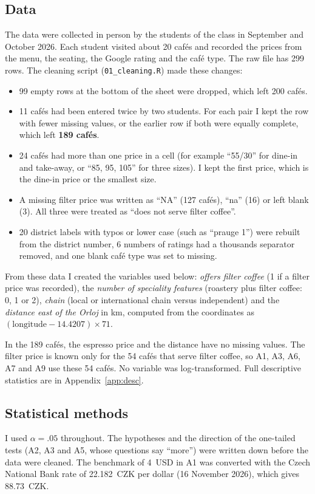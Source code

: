 \documentclass[11pt,a4paper]{article}
\begin{document}
\subsection{Data}
The data were collected in person by the students of the class in September and October 2026. Each student visited about 20 caf\'es and recorded the prices from the menu, the seating, the Google rating and the caf\'e type. The raw file has 299 rows. The cleaning script (\texttt{01\_cleaning.R}) made these changes:
\begin{itemize}
  \item 99 empty rows at the bottom of the sheet were dropped, which left 200 caf\'es.
  \item 11 caf\'es had been entered twice by two students. For each pair I kept the row with fewer missing values, or the earlier row if both were equally complete, which left \textbf{189 caf\'es}.
  \item 24 caf\'es had more than one price in a cell (for example ``55/30'' for dine-in and take-away, or ``85, 95, 105'' for three sizes). I kept the first price, which is the dine-in price or the smallest size.
  \item A missing filter price was written as ``NA'' (127 caf\'es), ``na'' (16) or left blank (3). All three were treated as ``does not serve filter coffee''.
  \item 20 district labels with typos or lower case (such as ``prauge 1'') were rebuilt from the district number, 6 numbers of ratings had a thousands separator removed, and one blank caf\'e type was set to missing.
\end{itemize}
From these data I created the variables used below: \emph{offers filter coffee} (1 if a filter price was recorded), the \emph{number of speciality features} (roastery plus filter coffee: 0, 1 or 2), \emph{chain} (local or international chain versus independent) and the \emph{distance east of the Orloj} in km, computed from the coordinates as $(\text{longitude}-14.4207)\times 71$.

In the 189 caf\'es, the espresso price and the distance have no missing values. The filter price is known only for the 54 caf\'es that serve filter coffee, so A1, A3, A6, A7 and A9 use these 54 caf\'es. No variable was log-transformed. Full descriptive statistics are in Appendix~\ref{app:desc}.

\subsection{Statistical methods}
I used $\alpha=.05$ throughout. The hypotheses and the direction of the one-tailed tests (A2, A3 and A5, whose questions say ``more'') were written down before the data were cleaned. The benchmark of 4~USD in A1 was converted with the Czech National Bank rate of 22.182~CZK per dollar (16 November 2026), which gives 88.73~CZK.
\end{document}
